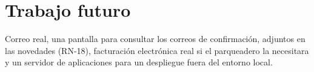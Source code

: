 \section{Trabajo futuro}
\begin{description}[style=nextline]
  \item[Mejoras posibles] Correo real, una pantalla para consultar los correos de confirmación, adjuntos en las novedades (RN-18), facturación electrónica real si el parqueadero la necesitara y un servidor de aplicaciones para un despliegue fuera del entorno local.
\end{description}
